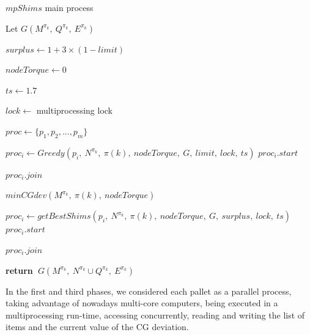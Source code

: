 \documentclass[preprint,authoryear]{elsarticle}
\renewcommand{\Return}{\State \bf {return}~}
\begin{document}
\begin{algorithm}[H]
	\caption{$mpShims$ main process}  \label{alg:mpShims}
	
	\begin{algorithmic}[1]
		
		
		\State Let $G(M^{\pi_k},\ Q^{\pi_k},\ E^{\pi_k})$ \label{mpShims:g1} 
		
		\State $surplus \gets 1 + 3 \times (1 - limit)$
		
		\State $nodeTorque \gets 0$
		
		\State $ts \gets 1.7$  \label{mpShims:ts}
		
		\State $lock \gets$ multiprocessing lock  \label{mpShims:lock} 
		
		\State $proc \gets \{p_1,p_2,..., p_m\}$  
		
		\State $proc_i \gets Greedy(p_i,\ N^{\pi_k},\ \pi(k),\ nodeTorque,\ G,\ limit,\ lock,\ ts )$   \label{mpShims:greedy}
		\State $proc_i.start$
		\EndFor
		
		\State $proc_i.join$ \label{mpShims:join1}
		\EndFor
		
		\State $minCGdev(M^{\pi_k},\ \pi(k),\ nodeTorque)$  \label{mpShims:minCGdev} 
		
		\State $proc_i \gets getBestShims(p_i,\ N^{\pi_k},\ \pi(k),\ nodeTorque,\ G,\ surplus,\ lock,\ ts )$ \label{mpShims:getBestShims}
		\State $proc_i.start$
		\EndFor
		
		\State $proc_i.join$ \label{mpShims:join2}

		\EndFor
		
		\Return $G(M^{\pi_k},\ N^{\pi_k} \cup Q^{\pi_k},\ E^{\pi_k})$ \label{mpShims:return}
		
		\EndProcedure
		
	\end{algorithmic}
\end{algorithm}

In the first and third phases, we considered each pallet as a parallel process, taking advantage of nowadays multi-core computers, being executed in a multiprocessing run-time, accessing concurrently, reading and writing the list of items and the current value of the CG deviation.
\end{document}
